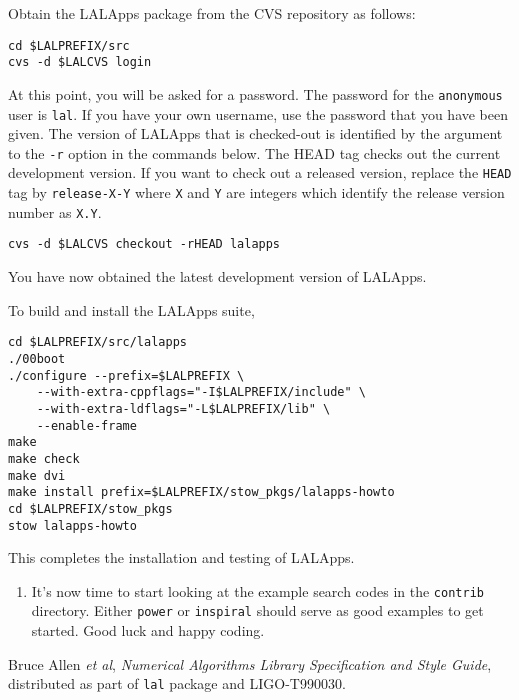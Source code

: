 Obtain the LALApps package from the CVS repository as follows:  
\begin{verbatim}
cd $LALPREFIX/src
cvs -d $LALCVS login
\end{verbatim}
At this point,  you will be asked for a password.  The password for the
\verb+anonymous+ user is \verb+lal+. If you have your own username, use the
password that you have been given.
The version of LALApps that is checked-out is identified by the argument
to the \texttt{-r} option in the commands below.   The HEAD tag checks out the
current development version.  If you want to check out a released
version, replace the \verb+HEAD+ tag by \verb+release-X-Y+ where
\verb+X+ and \verb+Y+ are integers which identify the release version
number as \verb+X.Y+.
\begin{verbatim}
cvs -d $LALCVS checkout -rHEAD lalapps
\end{verbatim}
You have now obtained the latest development version of LALApps.

To build and install the LALApps suite, 
\begin{verbatim}
cd $LALPREFIX/src/lalapps
./00boot
./configure --prefix=$LALPREFIX \
    --with-extra-cppflags="-I$LALPREFIX/include" \
    --with-extra-ldflags="-L$LALPREFIX/lib" \
    --enable-frame
make
make check
make dvi
make install prefix=$LALPREFIX/stow_pkgs/lalapps-howto
cd $LALPREFIX/stow_pkgs
stow lalapps-howto
\end{verbatim}
This completes the installation and testing of LALApps.  

\begin{enumerate}

\item It's now time to start looking at the example search codes in the
\verb+contrib+ directory.  Either \verb+power+ or \verb+inspiral+ should serve
as good examples to get started.   Good luck and happy coding.

\end{enumerate}

\pagebreak
\begin{thebibliography}{99}
 Bruce Allen \textit{et al}, \emph{Numerical Algorithms
Library Specification and Style Guide}, distributed as part of \verb+lal+ 
package and LIGO-T990030.
\end{thebibliography}


